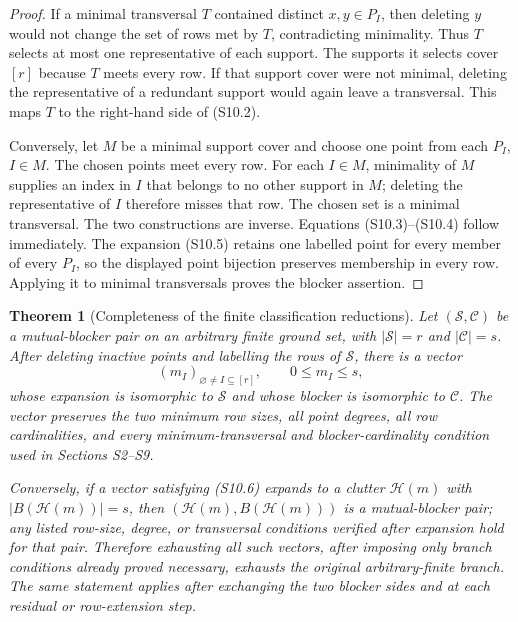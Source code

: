 \documentclass[11pt,a4paper]{article}
\newtheorem{theorem}{Theorem}[section]
\theoremstyle{definition}
\newcommand{\blocker}{B}
\begin{document}
\begin{proof}
If a minimal transversal $T$ contained distinct $x,y\in P_I$, then deleting
$y$ would not change the set of rows met by $T$, contradicting minimality.
Thus $T$ selects at most one representative of each support.  The supports
it selects cover $[r]$ because $T$ meets every row.  If that support cover
were not minimal, deleting the representative of a redundant support would
again leave a transversal.  This maps $T$ to the right-hand side of
(S10.2).

Conversely, let $M$ be a minimal support cover and choose one point from each
$P_I$, $I\in M$.  The chosen points meet every row.  For each $I\in M$,
minimality of $M$ supplies an index in $I$ that belongs to no other support
in $M$; deleting the representative of $I$ therefore misses that row.  The
chosen set is a minimal transversal.  The two constructions are inverse.
Equations (S10.3)--(S10.4) follow immediately.  The expansion (S10.5)
retains one labelled point for every member of every $P_I$, so the displayed
point bijection preserves membership in every row.  Applying it to minimal
transversals proves the blocker assertion.
\end{proof}

\begin{theorem}[Completeness of the finite classification reductions]
\label{thm:finite-classification-completeness}
Let $(\mathcal S,\mathcal C)$ be a mutual-blocker pair on an arbitrary finite
ground set, with $|\mathcal S|=r$ and $|\mathcal C|=s$.  After deleting
inactive points and labelling the rows of $\mathcal S$, there is a vector
\[
 (m_I)_{\varnothing\ne I\subseteq[r]},
 \qquad 0\leq m_I\leq s,                                 \tag{S10.6}
\]
whose expansion is isomorphic to $\mathcal S$ and whose blocker is
isomorphic to $\mathcal C$.  The vector preserves the two minimum row sizes,
all point degrees, all row cardinalities, and every minimum-transversal and
blocker-cardinality condition used in Sections S2--S9.

Conversely, if a vector satisfying (S10.6) expands to a clutter
$\mathcal H(m)$ with $|\blocker(\mathcal H(m))|=s$, then
$(\mathcal H(m),\blocker(\mathcal H(m)))$ is a mutual-blocker pair; any
listed row-size, degree, or transversal conditions verified after expansion
hold for that pair.  Therefore exhausting all such vectors, after imposing
only branch conditions already proved necessary, exhausts the original
arbitrary-finite branch.  The same statement applies after exchanging the
two blocker sides and at each residual or row-extension step.
\end{theorem}
\end{document}
